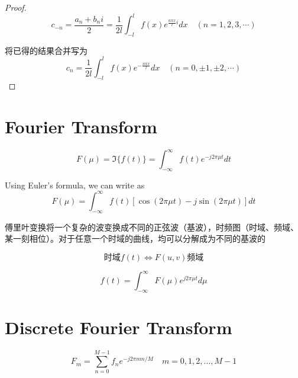 \begin{proof}
\begin{equation} c_{-n}=\frac{a_{n}+b_{n} {i}}{2}=\frac{1}{2 l} \int_{-l}^{l} f(x) {e}^{\frac{n \pi x}{l} i} {d} x \quad(n=1,2,3, \cdots) \end{equation}

将已得的结果合并写为
\begin{equation}
c_{n}=\frac{1}{2 l} \int_{-l}^{l} f(x) {e}^{-\frac{n \pi x}{l}} {d} x \quad(n=0, \pm 1, \pm 2, \cdots)
\end{equation}

\end{proof}

\section{Fourier Transform}

\begin{definition}
    \begin{equation}F(\mu) = \Im\{f(t)\}=\int_{-\infty}^{\infty} f(t) e^{-j 2 \pi \mu t} d t \end{equation}

    Using Euler's formula, we can write as
\begin{equation}
F(\mu)=\int_{-\infty}^{\infty} f(t)[\cos (2 \pi \mu t)-j \sin (2 \pi \mu t)] d t
\end{equation}
\end{definition}

傅里叶变换将一个复杂的波变换成不同的正弦波（基波），时频图（时域、频域、某一刻相位）。对于任意一个时域的曲线，均可以分解成为不同的基波的

\begin{equation}时域f(t) \Leftrightarrow F(u,v) 频域\end{equation}

\begin{definition}
    \begin{equation} f(t)=\int_{-\infty}^{\infty} F(\mu) e^{j 2 \pi \mu t} d \mu \end{equation}
\end{definition}


\section{Discrete Fourier Transform}

\begin{definition}
    \begin{equation} F_{m}=\sum_{n=0}^{M-1} f_{n} e^{-j 2 \pi m n / M} \quad m=0,1,2, \ldots, M-1 \end{equation}
\end{definition}

